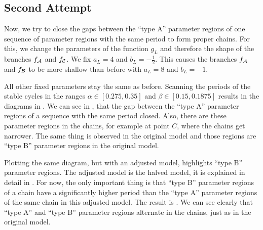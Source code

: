 \subsection{Second Attempt}
\label{sec:setup.quad.hyper.2}

Now, we try to close the gaps between the ``type A'' parameter regions of one sequence of parameter regions with the same period to form proper chains.
For this, we change the parameters of the function $g_L$ and therefore the shape of the branches $f_{\mathcal{A}}$ and $f_{\mathcal{C}}$.
We fix $a_L = 4$ and $b_L = -\frac{1}{2}$.
This causes the branches $f_{\mathcal{A}}$ and $f_{\mathcal{B}}$ to be more shallow than before with $a_L = 8$ and $b_L = -1$.

All other fixed parameters stay the same as before.
Scanning the periods of the stable cycles in the ranges $\alpha \in [0.275, 0.35]$ and $\beta \in [0.15, 0.1875]$ results in the diagrams in .
We can see in , that the gap between the ``type A'' parameter regions of a sequence with the same period closed.
Also, there are these parameter regions in the chains, for example at point $C$, where the chains get narrower.
The same thing is observed in the original model and those regions are ``type B'' parameter regions in the original model.

Plotting the same diagram, but with an adjusted model, highlights ``type B'' parameter regions.
The adjusted model is the halved model, it is explained in detail in .
For now, the only important thing is that ``type B'' parameter regions of a chain have a significantly higher period than the ``type A'' parameter regions of the same chain in this adjusted model.
The result is .
We can see clearly that ``type A'' and ``type B'' parameter regions alternate in the chains, just as in the original model.

